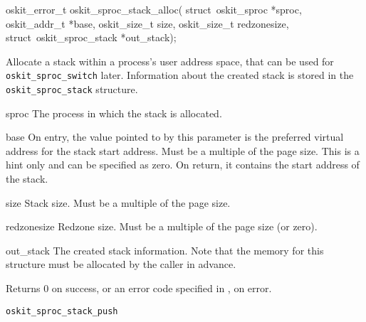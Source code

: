 \begin{apisyn}

        \funcproto oskit_error_t oskit_sproc_stack_alloc(
					struct~oskit_sproc *sproc, 
                                        \inoutparam oskit_addr_t *base,
                                        oskit_size_t size,
                                        oskit_size_t redzonesize,
                                        \outparam struct~oskit_sproc_stack *out_stack);
\end{apisyn}
\begin{apidesc}
        Allocate a stack within a process's user address space, 
        that can be used for \texttt{oskit_sproc_switch} later.
        Information about the created stack is stored in the
        \texttt{oskit_sproc_stack} structure.

\end{apidesc}
\begin{apiparm}
        \item[sproc]
                The process in which the stack is allocated.

        \item[base]
                On entry, the value pointed to by this parameter
                is the preferred virtual address for the
                stack start address.  Must be a multiple of the 
                page size.  This is a hint only and can be specified
                as zero.  On return, it contains the start address of the
                stack.

        \item[size]
                Stack size.  Must be a multiple of the page size.

        \item[redzonesize]
                Redzone size.  Must be a multiple of the page size (or zero).

        \item[out_stack] 
                The created stack information.  Note that the memory for
                this structure must be allocated by the caller in advance.

\end{apiparm}
\begin{apiret}
        Returns 0 on success, or an error code specified in
        , on error.
\end{apiret}
\begin{apirel}
        \texttt{oskit_sproc_stack_push}
\end{apirel}

